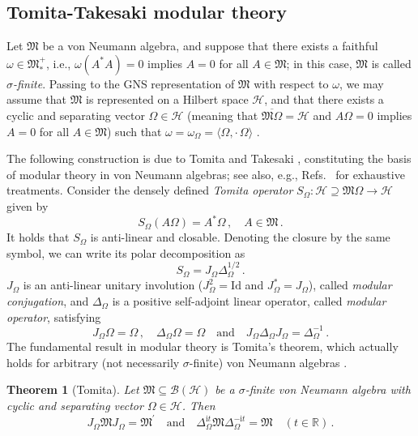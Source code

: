 \documentclass[a4paper, twoside, 11pt, reqno]{amsart}
\theoremstyle{definition}
\theoremstyle{plain}
\newtheorem{theorem}[definition]{Theorem}
\renewcommand{\subset}{\subseteq}
\renewcommand{\supset}{\supseteq}
\renewcommand{\Delta}{\varDelta}
\renewcommand{\Omega}{\varOmega}
\newcommand{\R}{\mathbb{R}}
\newcommand{\MH}{\mathcal{H}}
\newcommand{\MFM}{\mathfrak{M}}
\newcommand{\ii}{\mathrm{i}}
\newcommand{\BO}{\mathscr{B}}
\newcommand{\comm}[1]{#1^{\prime}}
\newcommand{\NF}[1]{#1_{\ast}^{+}}
\newcommand{\id}{\mathrm{Id}}
\newcommand{\1}{\mathbf{1}}
\newcommand{\braket}[2][]{#1\langle{#2}#1\rangle}
\newcommand{\oln}[1]{\overline{#1}}
\newcommand{\tand}{\quad\text{and}\quad}
\newcommand{\com}{{\, , \quad}}
\begin{document}
\subsection{Tomita-Takesaki modular theory}\label{subsec:modularTheory}

Let $\MFM$ be a von Neumann algebra, and suppose that there exists a faithful $\omega \in \NF{\MFM}$, i.e., $\omega(A^\ast A) = 0$ implies $A = 0$ for all $A \in \MFM$; in this case, $\MFM$ is called \emph{$\sigma$-finite}. Passing to the GNS representation of $\MFM$ with respect to $\omega$, we may assume that $\MFM$ is represented on a Hilbert space $\MH$, and that there exists a cyclic and separating vector $\Omega \in \MH$ (meaning that $\oln{\MFM \Omega} = \MH$ and $A \Omega = 0$ implies $A = 0$ for all $A \in \MFM$) such that $\omega = \omega_\Omega = \braket{\Omega, \cdot\, \Omega}$ \cite[p. 13]{Hiai2021}.

The following construction is due to Tomita and Takesaki \cite{Takesaki1970}, constituting the basis of modular theory in von Neumann algebras; see also, e.g., Refs.~\cite{Hiai2021, Stratila2020, StratilaZsido2019} for exhaustive treatments. Consider the densely defined \emph{Tomita operator} $S_\Omega : \MH \supset \MFM \Omega \to \MH$ given by
\begin{equation}\label{eq:TomitaOperator}
    S_{\Omega} (A \Omega) = A^\ast \Omega \com A \in \MFM \, .
\end{equation}
It holds that $S_\Omega$ is anti-linear and closable. Denoting the closure by the same symbol, we can write its polar decomposition as
\begin{equation}\label{eq:TomitaPolarDecomp}
    S_\Omega = J_\Omega \Delta_\Omega^{1/2} \, .
\end{equation}
$J_\Omega$ is an anti-linear unitary involution ($J_\Omega^2 = \id$ and $J_\Omega^\ast = J_\Omega$), called \emph{modular conjugation}, and $\Delta_\Omega$ is a positive self-adjoint linear operator, called \emph{modular operator}, satisfying \cite[p. 14]{Hiai2021}
\begin{equation}\label{eq:modularData}
    J_\Omega \Omega = \Omega \com \Delta_\Omega \Omega = \Omega \tand J_\Omega \Delta_\Omega J_\Omega = \Delta_\Omega^{-1} \, .
\end{equation}
The fundamental result in modular theory is Tomita's theorem, which actually holds for arbitrary (not necessarily $\sigma$-finite) von Neumann algebras \cite[Thm. 2.2]{Hiai2021}.

\begin{theorem}[Tomita]\label{thm:Tomita}
    Let $\MFM \subset \BO(\MH)$ be a $\sigma$-finite von Neumann algebra with cyclic and separating vector $\Omega \in \MH$. Then
    \begin{equation*}
        J_\Omega \MFM J_\Omega = \comm{\MFM} \quad \text{and} \quad \Delta_\Omega^{\ii t} \MFM \Delta_\Omega^{- \ii t} = \MFM \quad (t \in \R) \, .
    \end{equation*}
\end{theorem}
\end{document}
